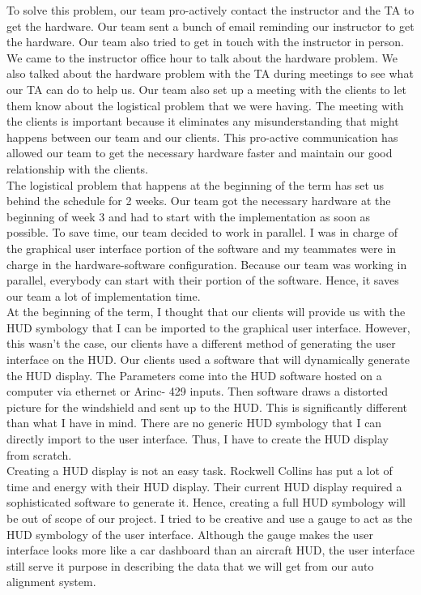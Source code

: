 To solve this problem, our team pro-actively contact the instructor and the TA to get the hardware. Our team sent a bunch of email reminding our instructor to get the hardware. Our team also tried to get in touch with the instructor in person. We came to the instructor office hour to talk about the hardware problem. We also talked about the hardware problem with the TA during meetings to see what our TA can do to help us. Our team also set up a meeting with the clients to let them know about the logistical problem that we were having. The meeting with the clients is important because it eliminates any misunderstanding that might happens between our team and our clients. This pro-active communication has allowed our team to get the necessary hardware faster and maintain our good relationship with the clients.\\

The logistical problem that happens at the beginning of the term has set us behind the schedule for 2 weeks. Our team got the necessary hardware at the beginning of week 3 and had to start with the implementation as soon as possible. To save time, our team decided to work in parallel. I was in charge of the graphical user interface portion of the software and my teammates were in charge in the hardware-software configuration. Because our team was working in parallel, everybody can start with their portion of the software. Hence, it saves our team a lot of implementation time. \\

At the beginning of the term, I thought that our clients will provide us with the HUD symbology that I can be imported to the graphical user interface. However, this wasn’t the case, our clients have a different method of generating the user interface on the HUD. Our clients used a software that will dynamically generate the HUD display. The Parameters come into the HUD software hosted on a computer via ethernet or Arinc- 429 inputs. Then software draws a distorted picture for the windshield and sent up to the HUD. This is significantly different than what I have in mind. There are no generic HUD symbology that I can directly import to the user interface. Thus, I have to create the HUD display from scratch. \\

Creating a HUD display is not an easy task. Rockwell Collins has put a lot of time and energy with their HUD display. Their current HUD display required a sophisticated software to generate it. Hence, creating a full HUD symbology will be out of scope of our project. I tried to be creative and use a gauge to act as the HUD symbology of the user interface. Although the gauge makes the user interface looks more like a car dashboard than an aircraft HUD, the user interface still serve it purpose in describing the data that we will get from our auto alignment system. 

